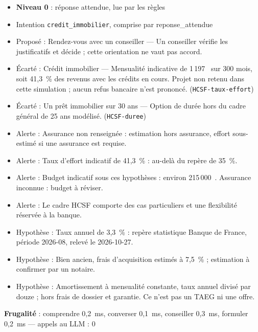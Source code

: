 \documentclass[11pt,a4paper]{article}
\newcommand{\frugal}[1]{{\scriptsize\color{darkgray}\textbf{Frugalité} : #1}\par\medskip}
\begin{document}
\begin{pourquoi}
\begin{itemize}
\item \textbf{Niveau 0} : réponse attendue, lue par les règles
\item Intention \texttt{credit\_immobilier}, comprise par reponse\_attendue
\item Proposé : Rendez-vous avec un conseiller --- Un conseiller vérifie les justificatifs et décide ; cette orientation ne vaut pas accord.
\item Écarté : Crédit immobilier --- Mensualité indicative de 1\,197~\texteuro{} sur 300 mois, soit 41,3~\% des revenus avec les crédits en cours. Projet non retenu dans cette simulation ; aucun refus bancaire n'est prononcé. (\texttt{HCSF-taux-effort})
\item Écarté : Un prêt immobilier sur 30 ans --- Option de durée hors du cadre général de 25 ans modélisé. (\texttt{HCSF-duree})
\item Alerte : Assurance non renseignée : estimation hors assurance, effort sous-estimé si une assurance est requise.
\item Alerte : Taux d'effort indicatif de 41,3~\% : au-delà du repère de 35~\%.
\item Alerte : Budget indicatif sous ces hypothèses : environ 215\,000~\texteuro{}. Assurance inconnue : budget à réviser.
\item Alerte : Le cadre HCSF comporte des cas particuliers et une flexibilité réservée à la banque.
\item Hypothèse : Taux annuel de 3,3~\% : repère statistique Banque de France, période 2026-08, relevé le 2026-10-27.
\item Hypothèse : Bien ancien, frais d'acquisition estimés à 7,5~\% ; estimation à confirmer par un notaire.
\item Hypothèse : Amortissement à mensualité constante, taux annuel divisé par douze ; hors frais de dossier et garantie. Ce n'est pas un TAEG ni une offre.
\end{itemize}
\end{pourquoi}
\frugal{comprendre 0,2~ms, converser 0,1~ms, conseiller 0,3~ms, formuler 0,2~ms --- appels au LLM : 0}
\end{document}
